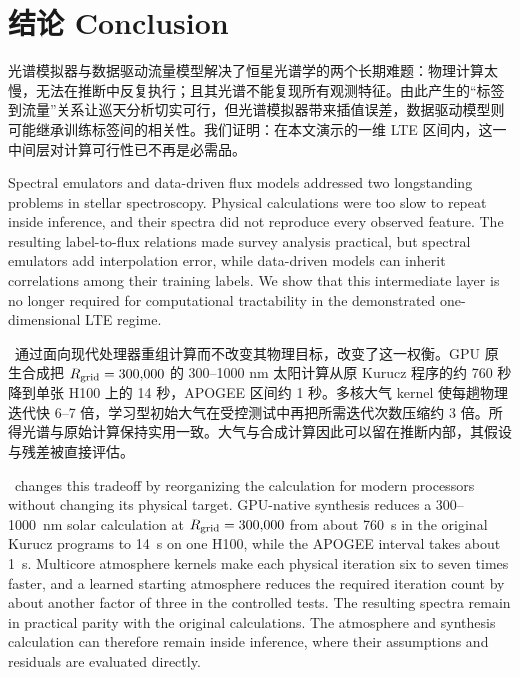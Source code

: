 \section{结论 Conclusion}\label{sec:conclusion}

光谱模拟器与数据驱动流量模型解决了恒星光谱学的两个长期难题：物理计算太慢，无法在推断中反复执行；且其光谱不能复现所有观测特征。由此产生的“标签到流量”关系让巡天分析切实可行，但光谱模拟器带来插值误差，数据驱动模型则可能继承训练标签间的相关性。我们证明：在本文演示的一维 LTE 区间内，这一中间层对计算可行性已不再是必需品。

\begin{EN}
Spectral emulators and data-driven flux models addressed two longstanding
problems in stellar spectroscopy. Physical calculations were too slow to
repeat inside inference, and their spectra did not reproduce every observed
feature. The resulting label-to-flux relations made survey analysis practical,
but spectral emulators add interpolation error, while data-driven models can
inherit correlations among their training labels. We show that this
intermediate layer is no longer required for computational tractability in the
demonstrated one-dimensional LTE regime.
\end{EN}

\paynezero\ 通过面向现代处理器重组计算而不改变其物理目标，改变了这一权衡。GPU 原生合成把 $R_{\rm grid}=300{,}000$ 的 300--1000 nm 太阳计算从原 Kurucz 程序的约 760 秒降到单张 H100 上的 14 秒，APOGEE 区间约 1 秒。多核大气 kernel 使每趟物理迭代快 6--7 倍，学习型初始大气在受控测试中再把所需迭代次数压缩约 3 倍。所得光谱与原始计算保持实用一致。大气与合成计算因此可以留在推断内部，其假设与残差被直接评估。

\begin{EN}
\paynezero\ changes this tradeoff by reorganizing the calculation for modern
processors without changing its physical target. GPU-native synthesis reduces
a 300--1000~nm solar calculation at $R_{\rm grid}=300{,}000$ from about 760~s in
the original Kurucz programs to 14~s on one H100, while the APOGEE interval
takes about 1~s. Multicore atmosphere kernels make each physical iteration six
to seven times faster, and a learned starting atmosphere reduces the required
iteration count by about another factor of three in the controlled tests. The
resulting spectra remain in practical parity with the original calculations.
The atmosphere and synthesis calculation can therefore remain inside
inference, where their assumptions and residuals are evaluated directly.
\end{EN}

